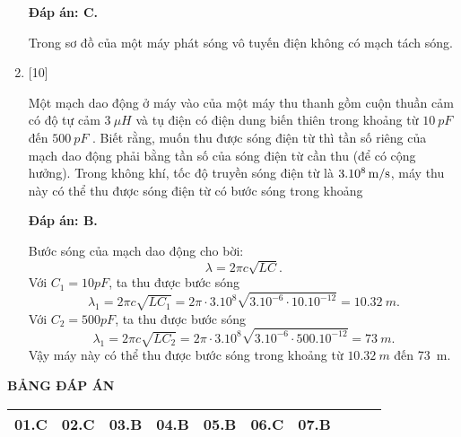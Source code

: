 \begin{enumerate}[label=\bfseries Câu \arabic*:]
	\loigiai
	{		\textbf{Đáp án: C.}
		
Trong sơ đồ của một máy phát sóng vô tuyến điện không có mạch tách sóng. 
		
	}

	\item {} [10]
	
	\cauhoi
	{Một mạch dao động ở máy vào của một máy thu thanh gồm cuộn thuần cảm có độ tự cảm $\SI{3}{\mu H}$ và tụ điện có điện dung biến thiên trong khoảng từ $\SI{10}{pF}$ đến $ \SI{500}{pF} $ . Biết rằng, muốn thu được sóng điện từ thì tần số riêng của mạch dao động phải bằng tần số của sóng điện từ cần thu (để có cộng hưởng). Trong không khí, tốc độ truyền sóng điện từ là $ \xsi{3.10^{8}}{m/s} $, máy thu này có thể thu được sóng điện từ có bước sóng trong khoảng

	}
	
	\loigiai
	{		\textbf{Đáp án: B.}
		
Bước sóng của mạch dao động cho bời:
$$
\lambda=2 \pi c \sqrt{L C}.
$$
Với $C_{1}=10 p F$, ta thu được bước sóng
$$
\lambda_{1}=2 \pi c \sqrt{L C_{1}}=2 \pi \cdot 3.10^{8} \sqrt{3.10^{-6} \cdot 10.10^{-12}}= \SI{10,32}{m}.
$$
Với $C_{2}=500 p F$, ta thu được bước sóng
$$
\lambda_{1}=2 \pi c \sqrt{L C_{2}}=2 \pi \cdot 3.10^{8} \sqrt{3.10^{-6} \cdot 500.10^{-12}}= \SI{73}{m}.
$$
Vậy máy này có thể thu được bước sóng trong khoảng từ $\SI{10,32}{m}$ đến \SI{73}{m}.
		
	}
	
\end{enumerate}

\loigiai
{
	\begin{center}
		\textbf{BẢNG ĐÁP ÁN}
	\end{center}
	\begin{center}
		\begin{tabular}{|m{2.8em}|m{2.8em}|m{2.8em}|m{2.8em}|m{2.8em}|m{2.8em}|m{2.8em}|m{2.8em}|m{2.8em}|m{2.8em}|}
			\hline
			01.C  & 02.C  & 03.B  & 04.B  & 05.B  & 06.C  & 07.B &  &  &  \\
			\hline
			
		\end{tabular}
	\end{center}
}

\whiteBGstarEnd